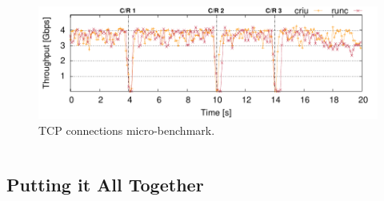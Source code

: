 \documentclass[9pt,    %
    english,            %
    xcolor=table,       %
    envcountsect,        %
    aspectratio=169     %
]{beamer}
\begin{document}
\begin{frame}
\begin{columns}
\begin{column}{.5\textwidth}
\begin{figure}
                \includegraphics[width=\textwidth]{./figs/tcp_established_resolution_microbenchmark.pdf}
                \caption{TCP connections micro-benchmark.\label{fig:tcp-microbecnhmark}}
            \end{figure}
        \end{column}
    \end{columns}
    
\end{frame}

\subsection{Putting it All Together}
\end{document}
